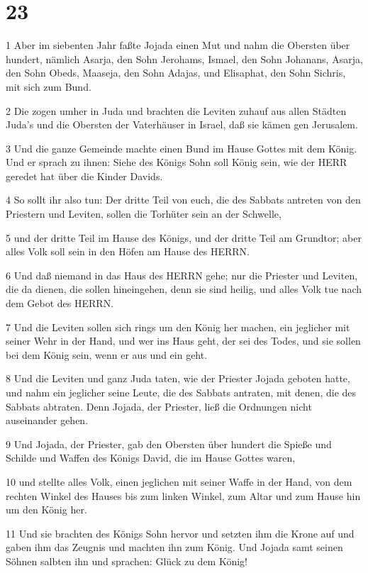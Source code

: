 \chapter{23}

\par 1 Aber im siebenten Jahr faßte Jojada einen Mut und nahm die Obersten über hundert, nämlich Asarja, den Sohn Jerohams, Ismael, den Sohn Johanans, Asarja, den Sohn Obeds, Maaseja, den Sohn Adajas, und Elisaphat, den Sohn Sichris, mit sich zum Bund.
\par 2 Die zogen umher in Juda und brachten die Leviten zuhauf aus allen Städten Juda's und die Obersten der Vaterhäuser in Israel, daß sie kämen gen Jerusalem.
\par 3 Und die ganze Gemeinde machte einen Bund im Hause Gottes mit dem König. Und er sprach zu ihnen: Siehe des Königs Sohn soll König sein, wie der HERR geredet hat über die Kinder Davids.
\par 4 So sollt ihr also tun: Der dritte Teil von euch, die des Sabbats antreten von den Priestern und Leviten, sollen die Torhüter sein an der Schwelle,
\par 5 und der dritte Teil im Hause des Königs, und der dritte Teil am Grundtor; aber alles Volk soll sein in den Höfen am Hause des HERRN.
\par 6 Und daß niemand in das Haus des HERRN gehe; nur die Priester und Leviten, die da dienen, die sollen hineingehen, denn sie sind heilig, und alles Volk tue nach dem Gebot des HERRN.
\par 7 Und die Leviten sollen sich rings um den König her machen, ein jeglicher mit seiner Wehr in der Hand, und wer ins Haus geht, der sei des Todes, und sie sollen bei dem König sein, wenn er aus und ein geht.
\par 8 Und die Leviten und ganz Juda taten, wie der Priester Jojada geboten hatte, und nahm ein jeglicher seine Leute, die des Sabbats antraten, mit denen, die des Sabbats abtraten. Denn Jojada, der Priester, ließ die Ordnungen nicht auseinander gehen.
\par 9 Und Jojada, der Priester, gab den Obersten über hundert die Spieße und Schilde und Waffen des Königs David, die im Hause Gottes waren,
\par 10 und stellte alles Volk, einen jeglichen mit seiner Waffe in der Hand, von dem rechten Winkel des Hauses bis zum linken Winkel, zum Altar und zum Hause hin um den König her.
\par 11 Und sie brachten des Königs Sohn hervor und setzten ihm die Krone auf und gaben ihm das Zeugnis und machten ihn zum König. Und Jojada samt seinen Söhnen salbten ihn und sprachen: Glück zu dem König!
